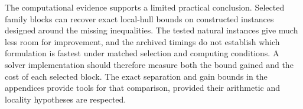 The computational evidence supports a limited practical conclusion.
Selected family blocks can recover exact local-hull bounds on constructed
instances designed around the missing inequalities. The tested natural
instances give much less room for improvement, and the archived timings
do not establish which formulation is fastest under matched selection
and computing conditions. A solver implementation should therefore
measure both the bound gained and the cost of each selected block.
The exact separation and gain bounds in the appendices provide tools
for that comparison, provided their arithmetic and locality hypotheses
are respected.
